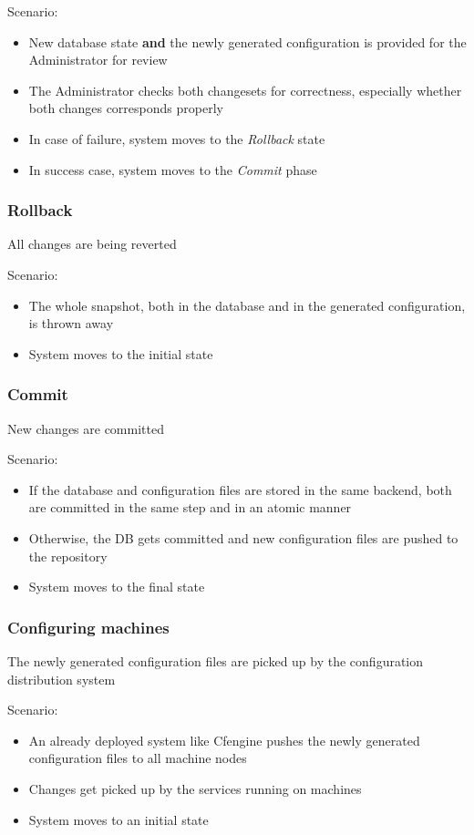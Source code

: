 \documentclass{article}
\begin{document}
Scenario:
\begin{itemize}
    \item{New database state {\bf and} the newly generated configuration is
        provided for the Administrator for review}
    \item{The Administrator checks both changesets for correctness, especially
        whether both changes corresponds properly}
    \item{In case of failure, system moves to the {\em Rollback} state}
    \item{In success case, system moves to the {\em Commit} phase}
\end{itemize}

\subsubsection{Rollback}
All changes are being reverted

Scenario:
\begin{itemize}
    \item{The whole snapshot, both in the database and in the generated
        configuration, is thrown away}
    \item{System moves to the initial state}
\end{itemize}

\subsubsection{Commit}
New changes are committed

Scenario:
\begin{itemize}
    \item{If the database and configuration files are stored in the same
        backend, both are committed in the same step and in an atomic manner}
    \item{Otherwise, the DB gets committed and new configuration files are
        pushed to the repository}
    \item{System moves to the final state}
\end{itemize}

\subsubsection{Configuring machines}
The newly generated configuration files are picked up by the configuration
distribution system

Scenario:
\begin{itemize}
    \item{An already deployed system like Cfengine pushes the newly generated
        configuration files to all machine nodes}
    \item{Changes get picked up by the services running on machines}
    \item{System moves to an initial state}
\end{itemize}
\end{document}
